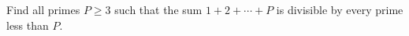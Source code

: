 Find all primes $P\ge3$ such that the sum $1+2+\cdots+P$ is divisible by every prime less than $P$.
